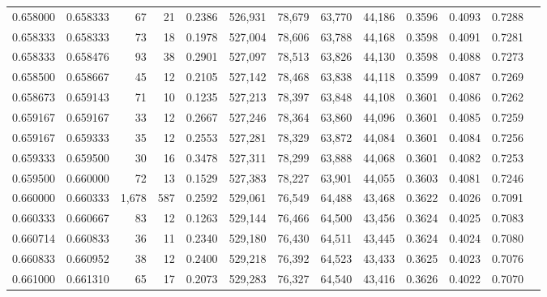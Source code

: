\begin{tabular}{rrrrrrrrrrrrr}
0.658000 & 0.658333 &    67 &  21 &                                     0.2386 & 526,931 &  78,679 &  63,770 &  44,186 & 0.3596 & 0.4093 & 0.7288 \\
0.658333 & 0.658333 &    73 &  18 &                                     0.1978 & 527,004 &  78,606 &  63,788 &  44,168 & 0.3598 & 0.4091 & 0.7281 \\
0.658333 & 0.658476 &    93 &  38 &                                     0.2901 & 527,097 &  78,513 &  63,826 &  44,130 & 0.3598 & 0.4088 & 0.7273 \\
0.658500 & 0.658667 &    45 &  12 &                                     0.2105 & 527,142 &  78,468 &  63,838 &  44,118 & 0.3599 & 0.4087 & 0.7269 \\
0.658673 & 0.659143 &    71 &  10 &                                     0.1235 & 527,213 &  78,397 &  63,848 &  44,108 & 0.3601 & 0.4086 & 0.7262 \\
0.659167 & 0.659167 &    33 &  12 &                                     0.2667 & 527,246 &  78,364 &  63,860 &  44,096 & 0.3601 & 0.4085 & 0.7259 \\
0.659167 & 0.659333 &    35 &  12 &                                     0.2553 & 527,281 &  78,329 &  63,872 &  44,084 & 0.3601 & 0.4084 & 0.7256 \\
0.659333 & 0.659500 &    30 &  16 &                                     0.3478 & 527,311 &  78,299 &  63,888 &  44,068 & 0.3601 & 0.4082 & 0.7253 \\
0.659500 & 0.660000 &    72 &  13 &                                     0.1529 & 527,383 &  78,227 &  63,901 &  44,055 & 0.3603 & 0.4081 & 0.7246 \\
0.660000 & 0.660333 & 1,678 & 587 &                                     0.2592 & 529,061 &  76,549 &  64,488 &  43,468 & 0.3622 & 0.4026 & 0.7091 \\
0.660333 & 0.660667 &    83 &  12 &                                     0.1263 & 529,144 &  76,466 &  64,500 &  43,456 & 0.3624 & 0.4025 & 0.7083 \\
0.660714 & 0.660833 &    36 &  11 &                                     0.2340 & 529,180 &  76,430 &  64,511 &  43,445 & 0.3624 & 0.4024 & 0.7080 \\
0.660833 & 0.660952 &    38 &  12 &                                     0.2400 & 529,218 &  76,392 &  64,523 &  43,433 & 0.3625 & 0.4023 & 0.7076 \\
0.661000 & 0.661310 &    65 &  17 &                                     0.2073 & 529,283 &  76,327 &  64,540 &  43,416 & 0.3626 & 0.4022 & 0.7070 \\

\end{tabular}
